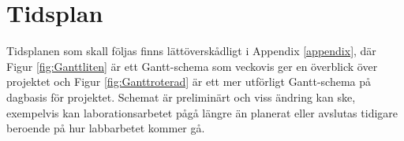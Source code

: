 \section{Tidsplan}
Tidsplanen som skall följas finns lättöverskådligt i Appendix \ref{appendix}, där Figur \ref{fig:Ganttliten} är ett Gantt-schema som veckovis ger en överblick över projektet och Figur \ref{fig:Ganttroterad} är ett mer utförligt Gantt-schema på dagbasis för projektet. Schemat är preliminärt och viss ändring kan ske, exempelvis kan laborationsarbetet pågå längre än planerat eller avslutas tidigare beroende på hur labbarbetet kommer gå.